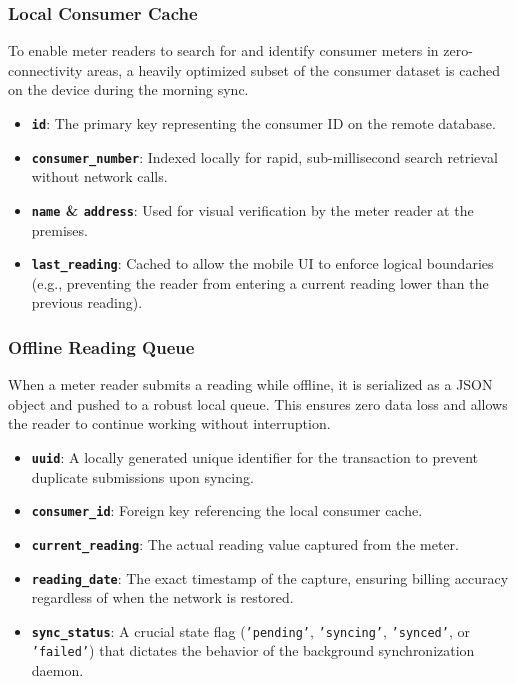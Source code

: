 \documentclass[12pt, a4paper, onecolumn]{report}
\begin{document}
\subsubsection{Local Consumer Cache}
To enable meter readers to search for and identify consumer meters in zero-connectivity areas, a heavily optimized subset of the consumer dataset is cached on the device during the morning sync.
\begin{itemize}
    \item \textbf{\texttt{id}}: The primary key representing the consumer ID on the remote database.
    \item \textbf{\texttt{consumer\_number}}: Indexed locally for rapid, sub-millisecond search retrieval without network calls.
    \item \textbf{\texttt{name} \& \texttt{address}}: Used for visual verification by the meter reader at the premises.
    \item \textbf{\texttt{last\_reading}}: Cached to allow the mobile UI to enforce logical boundaries (e.g., preventing the reader from entering a current reading lower than the previous reading).
\end{itemize}

\subsubsection{Offline Reading Queue}
When a meter reader submits a reading while offline, it is serialized as a JSON object and pushed to a robust local queue. This ensures zero data loss and allows the reader to continue working without interruption.
\begin{itemize}
    \item \textbf{\texttt{uuid}}: A locally generated unique identifier for the transaction to prevent duplicate submissions upon syncing.
    \item \textbf{\texttt{consumer\_id}}: Foreign key referencing the local consumer cache.
    \item \textbf{\texttt{current\_reading}}: The actual reading value captured from the meter.
    \item \textbf{\texttt{reading\_date}}: The exact timestamp of the capture, ensuring billing accuracy regardless of when the network is restored.
    \item \textbf{\texttt{sync\_status}}: A crucial state flag (\texttt{'pending'}, \texttt{'syncing'}, \texttt{'synced'}, or \texttt{'failed'}) that dictates the behavior of the background synchronization daemon.
\end{itemize}
\end{document}

